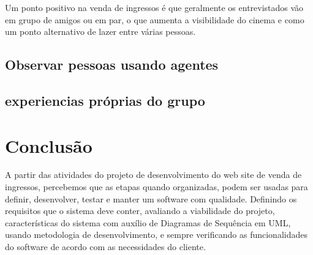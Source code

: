\documentclass[12pt]{article}
\begin{document}
        \begin{table}[h!]
            \centering
            \caption{Como você vai ao cinema na maioria das vezes}
            \label{table:Companhia_cinema}
        \end{table}
        \FloatBarrier
     
        Um ponto positivo na venda de ingressos é que geralmente os entrevistados vão em grupo de amigos ou em par, o que aumenta a visibilidade do cinema e como um ponto alternativo de lazer entre várias pessoas.
     
     \subsection{Observar pessoas usando agentes}
     
     \subsection{experiencias próprias do grupo}
     
\section{Conclusão}
A partir das atividades do projeto de desenvolvimento do web site de venda de ingressos, percebemos que as etapas quando organizadas, podem ser usadas para definir, desenvolver, testar e manter um software com qualidade. Definindo os requisitos que o sistema deve conter, avaliando a viabilidade do projeto, características do sistema com auxílio de Diagramas de Sequência em UML, usando metodologia de desenvolvimento, e sempre verificando as funcionalidades do software de acordo com as necessidades do cliente.

\nocite{*}


\end{document}
